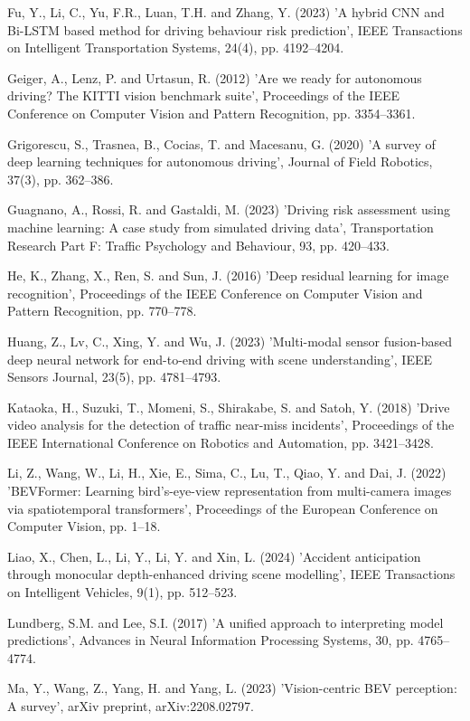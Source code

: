 \documentclass[11pt,a4paper]{article}
\begin{document}
\begin{list}{}{\setlength{\itemindent}{-1.5em}\setlength{\leftmargin}{1.5em}\setlength{\itemsep}{4pt}\setlength{\parsep}{0pt}}
\item Fu, Y., Li, C., Yu, F.R., Luan, T.H. and Zhang, Y. (2023) 'A hybrid CNN and Bi-LSTM based method for driving behaviour risk prediction', IEEE Transactions on Intelligent Transportation Systems, 24(4), pp. 4192--4204.
\item Geiger, A., Lenz, P. and Urtasun, R. (2012) 'Are we ready for autonomous driving? The KITTI vision benchmark suite', Proceedings of the IEEE Conference on Computer Vision and Pattern Recognition, pp. 3354--3361.
\item Grigorescu, S., Trasnea, B., Cocias, T. and Macesanu, G. (2020) 'A survey of deep learning techniques for autonomous driving', Journal of Field Robotics, 37(3), pp. 362--386.
\item Guagnano, A., Rossi, R. and Gastaldi, M. (2023) 'Driving risk assessment using machine learning: A case study from simulated driving data', Transportation Research Part F: Traffic Psychology and Behaviour, 93, pp. 420--433.
\item He, K., Zhang, X., Ren, S. and Sun, J. (2016) 'Deep residual learning for image recognition', Proceedings of the IEEE Conference on Computer Vision and Pattern Recognition, pp. 770--778.
\item Huang, Z., Lv, C., Xing, Y. and Wu, J. (2023) 'Multi-modal sensor fusion-based deep neural network for end-to-end driving with scene understanding', IEEE Sensors Journal, 23(5), pp. 4781--4793.
\item Kataoka, H., Suzuki, T., Momeni, S., Shirakabe, S. and Satoh, Y. (2018) 'Drive video analysis for the detection of traffic near-miss incidents', Proceedings of the IEEE International Conference on Robotics and Automation, pp. 3421--3428.
\item Li, Z., Wang, W., Li, H., Xie, E., Sima, C., Lu, T., Qiao, Y. and Dai, J. (2022) 'BEVFormer: Learning bird's-eye-view representation from multi-camera images via spatiotemporal transformers', Proceedings of the European Conference on Computer Vision, pp. 1--18.
\item Liao, X., Chen, L., Li, Y., Li, Y. and Xin, L. (2024) 'Accident anticipation through monocular depth-enhanced driving scene modelling', IEEE Transactions on Intelligent Vehicles, 9(1), pp. 512--523.
\item Lundberg, S.M. and Lee, S.I. (2017) 'A unified approach to interpreting model predictions', Advances in Neural Information Processing Systems, 30, pp. 4765--4774.
\item Ma, Y., Wang, Z., Yang, H. and Yang, L. (2023) 'Vision-centric BEV perception: A survey', arXiv preprint, arXiv:2208.02797.

\end{list}
\end{document}
